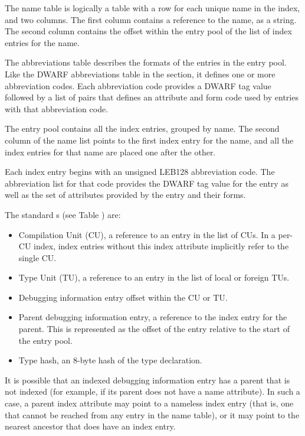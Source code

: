 The name table is logically a table with a row for each unique name in
the index, and two columns. The first column contains a reference to
the name, as a string. The second column contains the offset within
the entry pool of the list of index entries for the name.

The abbreviations table describes the formats of the entries in the
entry pool. Like the DWARF abbreviations table in the \dotdebugabbrev{}
section, it defines one or more abbreviation codes. Each abbreviation
code provides a DWARF tag value followed by a list of pairs that
defines an attribute and form code used by entries with that
abbreviation code.

The entry pool contains all the index entries, grouped by name. The
second column of the name list points to the first index entry for the
name, and all the index entries for that name are placed one after the
other.

Each index entry begins with an unsigned LEB128 abbreviation code.
The  abbreviation list for that code provides the DWARF tag value for
the entry as well as the set of attributes provided by the entry and
their forms.

The standard 
\bb
{}s (see Table )
\eb 
are:
\begin{itemize}
\item Compilation Unit (CU), a reference to an entry in the list of
    CUs. In a per-CU index, index entries without this 
\bb
	index attribute
\eb
    implicitly refer to the single CU.

\item Type Unit (TU), a reference to an entry in the list of local
    or foreign TUs.

\item Debugging information entry offset within the CU or TU.

\item Parent debugging information entry, 
    a reference to the index entry for the parent.
    This is represented as the offset of the entry relative to
    the start of the entry pool.

\item Type hash, an 8-byte hash of the type declaration.

\end{itemize}

It is possible that an indexed debugging information entry
has a parent that is not
indexed (for example, if its parent does not have a name attribute). 
In such a case, a parent 
\bb
index attribute
\eb
may point to a nameless index
entry (that is, one that cannot be reached from any entry in the
name table), or it may point to the nearest ancestor that does
have an index entry.

